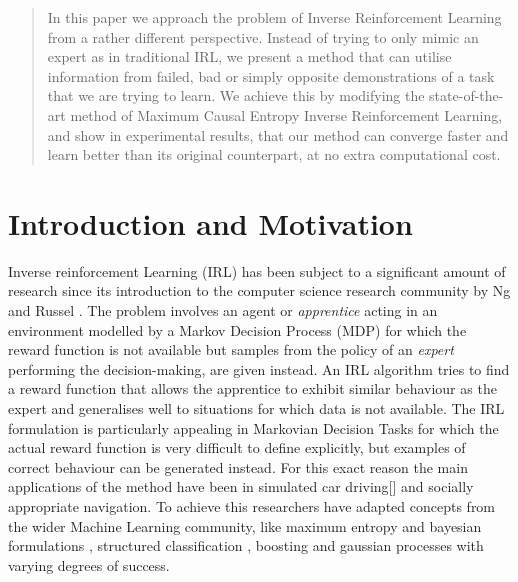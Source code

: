 \documentclass[conference]{IEEEtran}
\begin{document}
\begin{abstract}
In this paper we approach the problem of Inverse Reinforcement Learning from a rather different perspective. Instead of trying to only mimic an expert as in 
traditional IRL, we present a method that can utilise information from failed, bad or simply opposite demonstrations of a task that we are trying to learn. 
We achieve this by modifying the state-of-the-art method of Maximum Causal Entropy Inverse Reinforcement Learning, and show in experimental results, that our
method can converge faster and learn better than its original counterpart, at no extra computational cost. 
\end{abstract}

\IEEEpeerreviewmaketitle

\section{Introduction and Motivation}
Inverse reinforcement Learning (IRL) has been subject to a significant amount of research since its introduction to the computer science research community by Ng and Russel \cite{ng2000algorithms}. The problem involves an agent or \emph{apprentice} acting in an environment modelled by a Markov Decision Process (MDP) for which the reward function is not available but samples from the policy of an \emph{expert} performing the decision-making, are given instead. An IRL algorithm tries to find a reward function that allows the apprentice to exhibit similar behaviour as the expert and generalises well to situations for which data is not available. The IRL formulation is particularly appealing in Markovian Decision Tasks for which the actual reward function is very difficult to define explicitly, but examples of correct behaviour can be generated instead. For this exact reason the main applications of the method have been in simulated car driving[] and socially appropriate navigation\cite{henry2010learning}\cite{vasquez2014inverse}. To achieve this researchers have  adapted concepts from the wider Machine Learning community, like maximum entropy\cite{ziebart2008maximum} and bayesian formulations \cite{ramachandran2007bayesian}, structured classification \cite{ratliff2006maximum}, boosting \cite{ratliff2007boosting} and gaussian processes\cite{levine2011nonlinear} with varying degrees of success.\\
\end{document}
